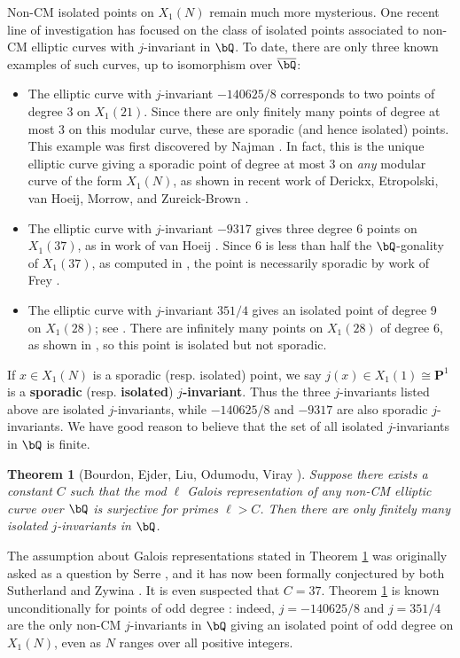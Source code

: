 \documentclass[11pt,reqno]{amsart}
\theoremstyle{plain}
\newtheorem{theorem}{Theorem}%
\theoremstyle{definition}
\newcommand{\Q}{\bQ}
\begin{document}
Non-CM isolated points on $X_1(N)$ remain much more mysterious. One recent line of investigation has focused on the class of isolated points associated to non-CM elliptic curves with $j$-invariant in $\Q$. To date, there are only three known examples of such curves, up to isomorphism over $\overline{\Q}$:
\begin{itemize}
\item The elliptic curve with $j$-invariant $-140625/8$ corresponds to two points of degree 3 on $X_1(21)$. Since there are only finitely many points of degree at most 3 on this modular curve, these are sporadic (and hence isolated) points. This example was first discovered by Najman \cite{najman16}. In fact, this is the unique elliptic curve giving a sporadic point of degree at most 3 on \emph{any} modular curve of the form $X_1(N)$, as shown in recent work of Derickx, Etropolski, van Hoeij, Morrow, and Zureick-Brown \cite{DEvHMZB2021}.
\item The elliptic curve with $j$-invariant $-9317$ gives three degree 6 points on $X_1(37)$, as in work of van Hoeij \cite{vanHoeij}. Since 6 is less than half the $\Q$-gonality of $X_1(37)$, as computed in \cite{DerickxVanHoeij2014}, the point is necessarily sporadic by work of Frey \cite{frey}.
\item The elliptic curve with $j$-invariant $351/4$ gives an isolated point of degree 9 on $X_1(28)$; see \cite[Theorem 2]{OddDeg}. There are infinitely many points on $X_1(28)$ of degree 6, as shown in \cite{DerickxVanHoeij2014}, so this point is isolated but not sporadic.
\end{itemize}

If $x \in X_1(N)$ is a sporadic (resp. isolated) point, we say $j(x) \in X_1(1) \cong \mathbf{P}^1$ is a \textbf{sporadic} (resp. \textbf{isolated}) \textbf{$j$-invariant}. Thus the three $j$-invariants listed above are isolated $j$-invariants, while $-140625/8$  and $-9317$ are also sporadic $j$-invariants. We have good reason to believe that the set of all isolated $j$-invariants in $\Q$ is finite.
\begin{theorem}[Bourdon, Ejder, Liu, Odumodu, Viray \cite{BELOV}]
\label{BELOVfiniteness}
Suppose there exists a constant $C$ such that the mod $\ell$ Galois representation of any non-CM elliptic curve over $\Q$ is surjective for primes $\ell>C$. Then there are only finitely many isolated $j$-invariants in $\Q$.
\end{theorem}

\noindent The assumption about Galois representations stated in Theorem \ref{BELOVfiniteness} was originally asked as a question by Serre \cite{serre72}, and it has now been formally conjectured by both Sutherland \cite{sutherland} and Zywina \cite{ZywinaImages}. It is even suspected that $C=37$. Theorem \ref{BELOVfiniteness} is known unconditionally for points of odd degree \cite{OddDeg}: indeed, $j=-140625/8$ and $j=351/4$ are the only non-CM $j$-invariants in $\Q$ giving an isolated point of odd degree on $X_1(N)$, even as $N$ ranges over all positive integers.
\end{document}
